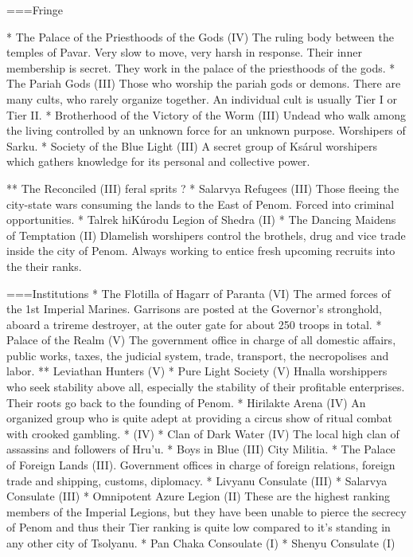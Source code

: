 ===Fringe

* The Palace of the Priesthoods of the Gods (IV) The ruling body between the temples of Pavar. Very slow to move, very harsh in response. Their inner membership is secret. They work in the palace of the priesthoods of the gods.
* The Pariah Gods (III) Those who worship the pariah gods or demons. There are many cults, who rarely organize together. An individual cult is usually Tier I or Tier II.
* Brotherhood of the Victory of the Worm (III) Undead who walk among the living controlled by an unknown force for an unknown purpose. Worshipers of Sarku.
* Society of the Blue Light (III) A secret group of Ksárul worshipers which gathers knowledge for its personal and collective power.

** The Reconciled (III) feral sprits ?
* Salarvya Refugees (III) Those fleeing the city-state wars consuming the lands to the East of Penom. Forced into criminal opportunities.
* Talrek hiKúrodu Legion of Shedra (II)
* The Dancing Maidens of Temptation (II) Dlamelish worshipers control the brothels, drug and vice trade inside the city of Penom. Always working to entice fresh upcoming recruits into the their ranks.

===Institutions
* The Flotilla of Hagarr of Paranta (VI) The armed forces of the 1st Imperial Marines. Garrisons are posted at the Governor's stronghold, aboard a trireme destroyer, at the outer gate for about 250 troops in total.
* Palace of the Realm (V) The government office in charge of all domestic affairs, public works, taxes, the judicial system, trade, transport, the necropolises and labor.
** Leviathan Hunters (V)
* Pure Light Society (V) Hnalla worshippers who seek stability above all, especially the stability of their profitable enterprises. Their roots go back to the founding of Penom. 
* Hirilakte Arena (IV) An organized group who is quite adept at providing a circus show of ritual combat with crooked gambling.
*   (IV)
* Clan of Dark Water (IV) The local high clan of assassins and followers of Hru'u.
* Boys in Blue (III) City Militia. 
* The Palace of Foreign Lands (III). Government offices in charge of foreign relations, foreign trade and shipping, customs, diplomacy.
* Livyanu Consulate (III)
* Salarvya Consulate (III)
* Omnipotent Azure Legion (II) These are the highest ranking members of the Imperial Legions, but they have been unable to pierce the secrecy of Penom and thus their Tier ranking is quite low compared to it's standing in any other city of Tsolyanu.
* Pan Chaka Consoulate (I)
* Shenyu Consulate (I)


